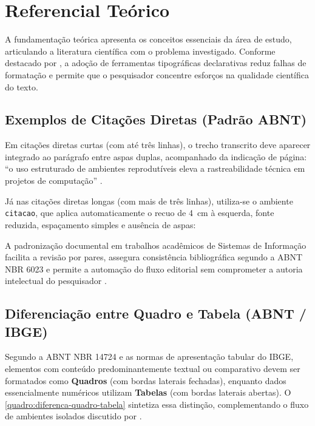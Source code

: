 \chapter{Referencial Teórico}

A fundamentação teórica apresenta os conceitos essenciais da área de estudo, articulando a literatura científica com o problema investigado. Conforme destacado por \textcite{exemplo2026}, a adoção de ferramentas tipográficas declarativas reduz falhas de formatação e permite que o pesquisador concentre esforços na qualidade científica do texto.

\section{Exemplos de Citações Diretas (Padrão ABNT)}

Em citações diretas curtas (com até três linhas), o trecho transcrito deve aparecer integrado ao parágrafo entre aspas duplas, acompanhado da indicação de página: ``o uso estruturado de ambientes reprodutíveis eleva a rastreabilidade técnica em projetos de computação'' \cite[p.~48]{exemplo2026}.

Já nas citações diretas longas (com mais de três linhas), utiliza-se o ambiente \texttt{citacao}, que aplica automaticamente o recuo de 4~cm à esquerda, fonte reduzida, espaçamento simples e ausência de aspas:

\begin{citacao}
A padronização documental em trabalhos acadêmicos de Sistemas de Informação facilita a revisão por pares, assegura consistência bibliográfica segundo a ABNT NBR 6023 e permite a automação do fluxo editorial sem comprometer a autoria intelectual do pesquisador \cite[p.~52]{exemplo2026}.
\end{citacao}

\section{Diferenciação entre Quadro e Tabela (ABNT / IBGE)}

Segundo a ABNT NBR 14724 e as normas de apresentação tabular do IBGE, elementos com conteúdo predominantemente textual ou comparativo devem ser formatados como \textbf{Quadros} (com bordas laterais fechadas), enquanto dados essencialmente numéricos utilizam \textbf{Tabelas} (com bordas laterais abertas). O \autoref{quadro:diferenca-quadro-tabela} sintetiza essa distinção, complementando o fluxo de ambientes isolados discutido por \textcite{devcontainer}.

